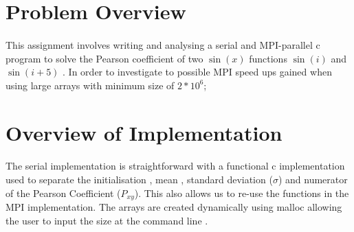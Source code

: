 \documentclass[12pt]{article}
\begin{document}
\maketitle


\section*{Problem Overview}
\paragraph{}
This assignment involves writing and analysing a serial 
and MPI-parallel c program to solve the Pearson coefficient
of two $\sin(x)$ functions $\sin(i)$ and $\sin(i+5)$ .      
In order to investigate to possible MPI speed ups gained when using large arrays with 
minimum size of $2*10^6$;


\section{Overview of Implementation}
\paragraph{}
The serial implementation is straightforward with a functional c implementation used to separate the initialisation , mean , standard deviation ($\sigma$) and numerator of the Pearson Coefficient ($P_{xy}$). This also allows us to re-use the functions in the MPI implementation. 
The arrays are created dynamically using malloc allowing the user to input the size at the command line .  
\end{document}
